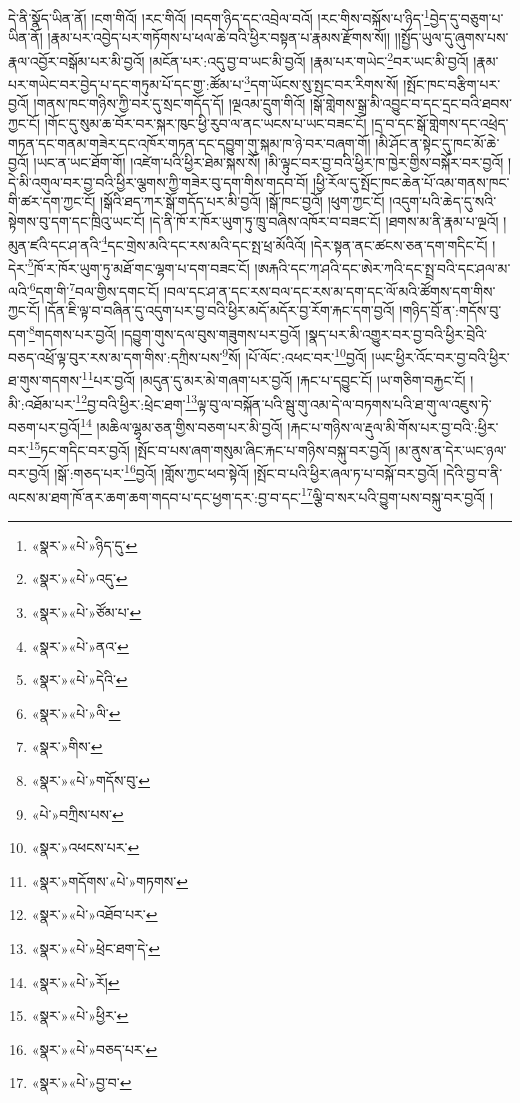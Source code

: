 དེ་ནི་སྣོད་ཡིན་ནོ། །ངག་གིའོ། །རང་གིའོ། །བདག་ཉིད་དང་འབྲེལ་བའོ། །རང་གིས་བསྐོས་པ་ཉིད་\footnote{«སྣར་»«པེ་»ཉིད་དུ་}བྱེད་དུ་བཅུག་པ་ཡིན་ནོ། །རྣམ་པར་འབྱེད་པར་གཏོགས་པ་ཕལ་ཆེ་བའི་ཕྱིར་བསྟན་པ་རྣམས་རྫོགས་སོ།། །།སྤྱོད་ཡུལ་དུ་ཞུགས་པས་རྣལ་འབྱོར་བསྒོམ་པར་མི་བྱའོ། །མངོན་པར་:འདུ་བྱ་བ་ཡང་མི་བྱའོ། །རྣམ་པར་གཡེང་\footnote{«སྣར་»«པེ་»འདུ་}བར་ཡང་མི་བྱའོ། །རྣམ་པར་གཡེང་བར་བྱེད་པ་དང་གཏུམ་པོ་དང་གྱ་:ཚོམ་པ་\footnote{«སྣར་»«པེ་»ཙོམ་པ་}དག་ཡོངས་སུ་སྤང་བར་རིགས་སོ། །སྤོང་ཁང་བརྩིག་པར་བྱའོ། །གནས་ཁང་གཉིས་ཀྱི་བར་དུ་སྲང་གདོད་དོ། །ལྔའམ་དྲུག་གིའོ། །སྒོ་གླེགས་སྒྲ་མི་འབྱུང་བ་དང་དྲང་བའི་ཐབས་ཀྱང་ངོ། །གོང་དུ་སུམ་ཆ་བོར་བར་སྐར་ཁུང་ཕྱི་རུབ་ལ་ནང་ཡངས་པ་ཡང་བཟང་ངོ། །དྲ་བ་དང་སྒོ་གླེགས་དང་འཕྲེད་གཏན་དང་གནམ་གཟེར་དང་འཁོར་གཏན་དང་དབྱུག་གུ་སྐམ་ཁ་ཉེ་བར་བཞག་གོ། །མི་ཤོང་ན་སྟེང་དུ་ཁང་མོ་ཆེ་བྱའོ། །ཡང་ན་ཡང་ཐོག་གོ། །འཛེག་པའི་ཕྱིར་ཐེམ་སྐས་སོ། །མི་ལྟུང་བར་བྱ་བའི་ཕྱིར་ཁ་ཁྱེར་གྱིས་བསྐོར་བར་བྱའོ། །དེ་མི་འགུལ་བར་བྱ་བའི་ཕྱིར་ལྕགས་ཀྱི་གཟེར་བུ་དག་གིས་གདབ་བོ། །ཕྱི་རོལ་དུ་སྤོང་ཁང་ཆེན་པོ་འམ་གནས་ཁང་གི་ཚར་དག་ཀྱང་ངོ། །སྒོའི་ཐད་ཀར་སྒོ་གདོད་པར་མི་བྱའོ། །སྒོ་ཁང་བྱའོ། །ཕུག་ཀྱང་ངོ། །འདུག་པའི་ཆེད་དུ་སའི་སྟེགས་བུ་དག་དང་ཁྲིའུ་ཡང་ངོ། །དེ་ནི་ཁོ་ར་ཁོར་ཡུག་ཏུ་ཁྲུ་བཞིས་འཁོར་བ་བཟང་ངོ། །ཐགས་མ་ནི་རྣམ་པ་ལྔའོ། །མུན་ཛའི་དང་ཤ་ནའི་\footnote{«སྣར་»«པེ་»ནའ་}དང་གྲེས་མའི་དང་རས་མའི་དང་སྤ་ཕྲ་མོའིའོ། །དེར་སྟན་ནང་ཚངས་ཅན་དག་གདིང་ངོ། །དེར་\footnote{«སྣར་»«པེ་»དེའི་}ཁོ་ར་ཁོར་ཡུག་ཏུ་མཐོ་གང་ལྷག་པ་དག་བཟང་ངོ། །ཨརྐའི་དང་ཀ་ཤའི་དང་ཨེར་ཀའི་དང་སྤྲ་བའི་དང་ཤལ་མ་ལའི་\footnote{«སྣར་»«པེ་»ལི་}དག་གི་\footnote{«སྣར་»གིས་}བལ་གྱིས་དགང་ངོ། །བལ་དང་ཤ་ན་དང་རས་བལ་དང་རས་མ་དག་དང་ལོ་མའི་ཚོགས་དག་གིས་ཀྱང་ངོ། །དོན་ཇི་ལྟ་བ་བཞིན་དུ་འདུག་པར་བྱ་བའི་ཕྱིར་མདོ་མདོར་བྱ་རོག་རྐང་དག་བྱའོ། །གཉིད་བྲོ་ན་:གདོས་བུ་དག་\footnote{«སྣར་»«པེ་»གདོས་བུ་}གདགས་པར་བྱའོ། །དབྱུག་གུས་དལ་བུས་གཟུགས་པར་བྱའོ། །སྣད་པར་མི་འགྱུར་བར་བྱ་བའི་ཕྱིར་བྲེའི་བཅད་འཕྲོ་ལྟ་བུར་རས་མ་དག་གིས་:དཀྲིས་པས་\footnote{«པེ་»བཀྲིས་པས་}སོ། །པོ་ལོང་:འཕང་བར་\footnote{«སྣར་»འཕངས་པར་}བྱའོ། །ཡང་ཕྱིར་འོང་བར་བྱ་བའི་ཕྱིར་ཐ་གུས་གདགས་\footnote{«སྣར་»གདོགས་«པེ་»གཏགས་}པར་བྱའོ། །མདུན་དུ་མར་མེ་གཞག་པར་བྱའོ། །རྐང་པ་དབྱུང་ངོ། །ཡ་གཅིག་བརྐྱང་ངོ། །མི་:འཐོམ་པར་\footnote{«སྣར་»«པེ་»འཐོབ་པར་}བྱ་བའི་ཕྱིར་:ཕྲེང་ཐག་\footnote{«སྣར་»«པེ་»ཕྲེང་ཐག་དེ་}ལྟ་བུ་ལ་བསྐོན་པའི་སྦུ་གུ་འམ་དེ་ལ་བཏགས་པའི་ཐ་གུ་ལ་འཇུས་ཏེ་བཅག་པར་བྱའོ།\footnote{«སྣར་»«པེ་»རོ།} །མཆིལ་ལྷྭམ་ཅན་གྱིས་བཅག་པར་མི་བྱའོ། །རྐང་པ་གཉིས་ལ་རྡུལ་མི་གོས་པར་བྱ་བའི་:ཕྱིར་བར་\footnote{«སྣར་»«པེ་»ཕྱིར་}ཏང་གདིང་བར་བྱའོ། །སྤོང་བ་པས་ཞག་གསུམ་ཞིང་རྐང་པ་གཉིས་བསྐུ་བར་བྱའོ། །མ་ནུས་ན་དེར་ཡང་ཉལ་བར་བྱའོ། །སྒོ་:གཅད་པར་\footnote{«སྣར་»«པེ་»བཅད་པར་}བྱའོ། །གློས་ཀྱང་ཕབ་སྟེའོ། །སྤོང་བ་པའི་ཕྱིར་ཞལ་ཏ་པ་བསྐོ་བར་བྱའོ། །དེའི་བྱ་བ་ནི་ལངས་མ་ཐག་ཁོ་ནར་ཆག་ཆག་གདབ་པ་དང་ཕྱག་དར་:བྱ་བ་དང་\footnote{«སྣར་»«པེ་»བྱ་བ་}ལྕི་བ་སར་པའི་བྱུག་པས་བསྐུ་བར་བྱའོ། །
